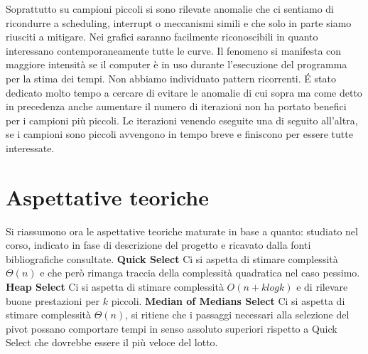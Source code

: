 \documentclass{article}
\begin{document}
\newline
\newline
Soprattutto su campioni piccoli si sono rilevate anomalie che ci sentiamo di ricondurre a scheduling, interrupt o meccanismi simili e che solo in parte siamo riusciti a mitigare.
\newline
Nei grafici saranno facilmente riconoscibili in quanto interessano contemporaneamente tutte le curve.
\newline
\newline
Il fenomeno si manifesta con maggiore intensità se il computer è in uso durante l'esecuzione del programma per la stima dei tempi. Non abbiamo individuato pattern ricorrenti.
\newline
\newline
É stato dedicato molto tempo a cercare di evitare le anomalie di cui sopra ma come detto in precedenza anche aumentare il numero di iterazioni non ha portato benefici per i campioni più piccoli. Le iterazioni venendo eseguite una di seguito all'altra, se i campioni sono piccoli avvengono in tempo breve e finiscono per essere tutte interessate.

\section{Aspettative teoriche}
Si riassumono ora le aspettative teoriche maturate in base a quanto: studiato nel corso, indicato in fase di descrizione del progetto e ricavato dalla fonti bibliografiche consultate.
\newline
\newline
\textbf{Quick Select}
\newline
Ci si aspetta di stimare complessità $\Theta(n)$ e che però rimanga traccia della complessità quadratica nel caso pessimo.
\newline
\newline
\textbf{Heap Select}
\newline
Ci si aspetta di stimare complessità $O(n + k log k)$ e di rilevare buone prestazioni per $k$ piccoli.
\newline
\newline
\textbf{Median of Medians Select}
\newline
Ci si aspetta di stimare complessità $\Theta(n)$, si ritiene che i passaggi necessari alla selezione del pivot possano comportare tempi in senso assoluto superiori rispetto a Quick Select che dovrebbe essere il più veloce del lotto.

\newpage
\end{document}
